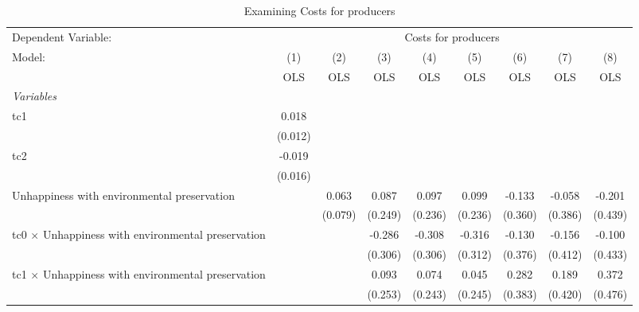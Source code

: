 
\begin{table}[htbp]
   \caption{Examining Costs for producers}
   \centering
   \begin{tabular}{lcccccccc}
      \toprule
      Dependent Variable: & \multicolumn{8}{c}{Costs for producers}\\
      Model:                                                    & (1)     & (2)     & (3)     & (4)     & (5)     & (6)     & (7)           & (8)\\  
                                                                &  OLS    & OLS     & OLS     & OLS     & OLS     & OLS     & OLS           & OLS\\  
      \midrule
      \emph{Variables}\\
      tc1                                                       & 0.018   &         &         &         &         &         &               &   \\   
                                                                & (0.012) &         &         &         &         &         &               &   \\   
      tc2                                                       & -0.019  &         &         &         &         &         &               &   \\   
                                                                & (0.016) &         &         &         &         &         &               &   \\   
      Unhappiness with environmental preservation               &         & 0.063   & 0.087   & 0.097   & 0.099   & -0.133  & -0.058        & -0.201\\   
                                                                &         & (0.079) & (0.249) & (0.236) & (0.236) & (0.360) & (0.386)       & (0.439)\\   
      tc0 $\times$ Unhappiness with environmental preservation  &         &         & -0.286  & -0.308  & -0.316  & -0.130  & -0.156        & -0.100\\   
                                                                &         &         & (0.306) & (0.306) & (0.312) & (0.376) & (0.412)       & (0.433)\\   
      tc1 $\times$ Unhappiness with environmental preservation  &         &         & 0.093   & 0.074   & 0.045   & 0.282   & 0.189         & 0.372\\   
                                                                &         &         & (0.253) & (0.243) & (0.245) & (0.383) & (0.420)       & (0.476)\\   

\end{tabular}
\end{table}
